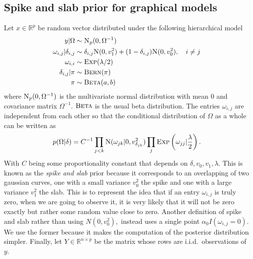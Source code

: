 \documentclass{scrartcl}
\newcommand{\R}{\mathbb{R}}
\newcommand{\inv}{^{-1}}
\newcommand{\Np}{\textsc{N}_p}
\newcommand{\Nor}{\textsc{N}}
\newcommand{\Bern}{\textsc{Bern}}
\newcommand{\Beeta}{\textsc{Beta}}
\newcommand{\Exp}{\textsc{Exp}}
\begin{document}
\subsection{Spike and slab prior for graphical models}
Let $x \in \R^p$ be random vector distributed under the following hierarchical model
\begin{align*}
	y | \Omega                  & \sim \Np(0, \Omega\inv)                                                              \\
	\omega_{i,j} | \delta_{i,j} & \sim \delta_{i,j} \Nor(0, v_1^2) + (1 - \delta_{i,j}) \Nor(0, v_0^2), \quad i \neq j \\
	\omega_{i,i}                & \sim \textsc{Exp}(\lambda / 2)                                                       \\
	\delta_{i,j} | \pi          & \sim \Bern(\pi)                                                                      \\
	\pi                         & \sim \Beeta(a,b)
\end{align*}
where $\Np(0, \Omega\inv)$ is the multivariate normal distribution with mean $0$ and
covariance matrix $\Omega\inv$.
$\Beeta$ is the usual beta distribution. The entries $\omega_{i,j}$ are independent from each other so that the conditional distribution of $\Omega$ as a whole can be written as
\[p(\Omega | \delta) = C\inv \prod_{j < k}  \Nor(\omega_{jk} | 0,
	v_{\delta_{jk}}^2) \prod_j \Exp\left(\omega_{jj} | \frac{\lambda}{2}\right).\]
With $C$ being some proportionality constant that depends on $\delta, v_0, v_1, \lambda$.
This is known as the \emph{spike and slab} prior because it corresponds to an overlapping of two gaussian curves, one with a small variance $v_0^2$ the spike and one with a large variance $v_1^2$ the slab.
This is to represent the idea that if an entry $\omega_{i,j}$ is truly zero,
when we are going to observe it, it is very likely that it will not be zero
exactly but rather some random value close to zero. Another definition of spike
and slab rather than using $N(0, v_0^2),$ instead uses a single point $\alpha_0
	I(\omega_{i,j} = 0).$ We use the former because it makes the computation of the
posterior distribution simpler.
Finally, let $Y \in \R^{n \times p}$ be the matrix whose rows are i.i.d.\
observations of $y$.
\end{document}
